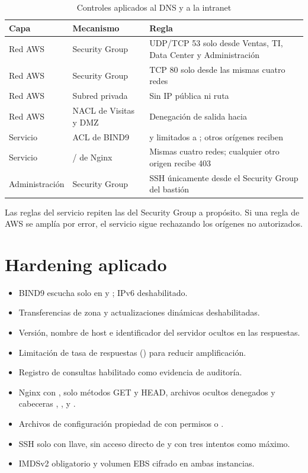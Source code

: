 \begin{table}[H]
\centering
\caption{Controles aplicados al DNS y a la intranet}
\begin{tabularx}{\textwidth}{p{3.4cm}p{3.4cm}Y}
\toprule
\textbf{Capa} & \textbf{Mecanismo} & \textbf{Regla} \\
\midrule
Red AWS & Security Group  & UDP/TCP 53 solo desde Ventas, TI, Data Center y Administración \\
Red AWS & Security Group  & TCP 80 solo desde las mismas cuatro redes \\
Red AWS & Subred privada & Sin IP pública ni ruta  \\
Red AWS & NACL de Visitas y DMZ & Denegación de salida hacia  \\
Servicio & ACL de BIND9 &  y  limitados a ; otros orígenes reciben  \\
Servicio & / de Nginx & Mismas cuatro redes; cualquier otro origen recibe 403 \\
Administración & Security Group & SSH únicamente desde el Security Group del bastión \\
\bottomrule
\end{tabularx}
\end{table}

Las reglas del servicio repiten las del Security Group a propósito. Si una regla de AWS se
amplía por error, el servicio sigue rechazando los orígenes no autorizados.

\section{Hardening aplicado}

\begin{itemize}
  \item BIND9 escucha solo en  y ; IPv6 deshabilitado.
  \item Transferencias de zona y actualizaciones dinámicas deshabilitadas.
  \item Versión, nombre de host e identificador del servidor ocultos en las respuestas.
  \item Limitación de tasa de respuestas () para reducir amplificación.
  \item Registro de consultas habilitado como evidencia de auditoría.
  \item Nginx con , solo métodos GET y HEAD, archivos ocultos denegados
        y cabeceras , ,
         y .
  \item Archivos de configuración propiedad de  con permisos  o .
  \item SSH solo con llave, sin acceso directo de  y con tres intentos como máximo.
  \item IMDSv2 obligatorio y volumen EBS cifrado en ambas instancias.
\end{itemize}

